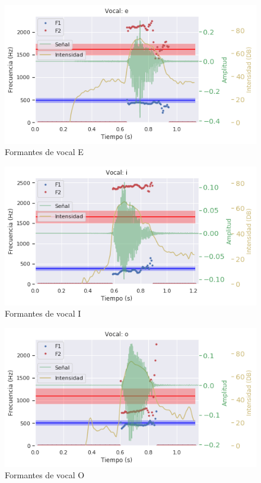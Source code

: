 \begin{figure}[H]
\caption{Formantes de vocal E}
\label{img:formantes_e}
\includegraphics[width=\textwidth]{imagenes/04_02_e.png}
\end{figure}

\begin{figure}[H]
\caption{Formantes de vocal I}
\label{img:formantes_i}
\includegraphics[width=\textwidth]{imagenes/04_02_i.png}
\end{figure}

\begin{figure}[H]
\caption{Formantes de vocal O}
\label{img:formantes_o}
\includegraphics[width=\textwidth]{imagenes/04_02_o.png}
\end{figure}

